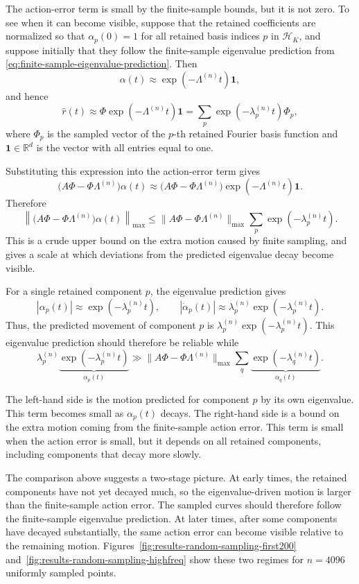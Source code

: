 The action-error term is small by the finite-sample bounds, but it is not zero.
To see when it can become visible, suppose that the retained coefficients are
normalized so that \(\alpha_p(0)=1\) for all retained basis indices \(p\) in \(\mathcal H_K\), and
suppose initially that they follow the finite-sample eigenvalue prediction from \eqref{eq:finite-sample-eigenvalue-prediction}.
Then
\[
	\alpha(t)
	\approx
	\exp(-\Lambda^{(n)}t)\mathbf 1,
\]
and hence
\[
	\widehat r(t)
	\approx
	\Phi\exp(-\Lambda^{(n)}t)\mathbf 1
	=
	\sum_p \exp(-\lambda_p^{(n)}t)\Phi_p,
\]
where \(\Phi_p\) is the sampled vector of the \(p\)-th retained Fourier basis
function and \(\mathbf 1\in\mathbb R^d\) is the vector with all entries equal to one.

Substituting this expression into the action-error term gives
\[
	\bigl(A\Phi-\Phi\Lambda^{(n)}\bigr)\alpha(t)
	\approx
	\bigl(A\Phi-\Phi\Lambda^{(n)}\bigr)
	\exp(-\Lambda^{(n)}t)\mathbf 1 .
\]
Therefore
\[
	\left\|
	\bigl(A\Phi-\Phi\Lambda^{(n)}\bigr)\alpha(t)
	\right\|_{\max}
	\le
	\|A\Phi-\Phi\Lambda^{(n)}\|_{\max}
	\sum_p \exp(-\lambda_p^{(n)}t).
\]
This is a crude upper bound on the extra motion caused by finite sampling, and gives a scale at which
deviations from the predicted eigenvalue decay become visible.

For a single retained component \(p\), the eigenvalue prediction gives
\[
	|\alpha_p(t)|
	\approx
	\exp(-\lambda_p^{(n)}t),
	\qquad
	|\dot\alpha_p(t)|
	\approx
	\lambda_p^{(n)}\exp(-\lambda_p^{(n)}t).
\]
Thus, the predicted movement of component \(p\) is \(\lambda_p^{(n)}\exp(-\lambda_p^{(n)}t)\).
This eigenvalue prediction should therefore be reliable while
\[
	\lambda_p^{(n)}\underbrace{\exp(-\lambda_p^{(n)}t)}_{\alpha_p(t)}
	\gg
	\|A\Phi-\Phi\Lambda^{(n)}\|_{\max} \sum_q \underbrace{\exp(-\lambda_q^{(n)}t)}_{\alpha_q(t)}.
\]

The left-hand side is the motion predicted for component \(p\) by its own eigenvalue.
This term becomes small as \(\alpha_p(t)\) decays.
The right-hand side is a bound on the extra motion coming from the
finite-sample action error. This term is small when the action error is small,
but it depends on all retained components, including components that decay more
slowly.

The comparison above suggests a two-stage picture. At early times, the
retained components have not yet decayed much, so the eigenvalue-driven motion
is larger than the finite-sample action error. The sampled curves should
therefore follow the finite-sample eigenvalue prediction. At later times, after
some components have decayed substantially, the same action error can become
visible relative to the remaining motion. Figures~\ref{fig:results-random-sampling-first200}
and~\ref{fig:results-random-sampling-highfreq} show these two regimes for
\(n=4096\) uniformly sampled points.

